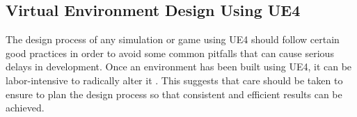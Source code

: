 


\subsection{Virtual Environment Design Using UE4}
The design process of any simulation or game using UE4 should follow certain good practices in order to avoid some common pitfalls that can cause serious delays in development. Once an environment has been built using UE4, it can be labor-intensive to radically alter it \cite[p.~454]{Rouse2005GamePractice}. This suggests that care should be taken to ensure to plan the design process so that consistent and efficient results can be achieved.

